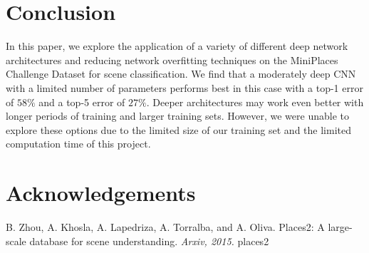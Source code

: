 \documentclass[10pt,twocolumn,letterpaper]{article}
\begin{document}
\section{Conclusion}

In this paper, we explore the application of a variety of different deep network architectures and reducing network overfitting techniques on the MiniPlaces Challenge Dataset for scene classification. We find that a moderately deep CNN with a limited number of parameters performs best in this case with a top-1 error of $58\%$ and a top-5 error of $27\%$. Deeper architectures may work even better with longer periods of training and larger training sets. However, we were unable to explore these options due to the limited size of our training set and the limited computation time of this project.

\section{Acknowledgements}

\begin{thebibliography}{1}

  B. Zhou, A. Khosla, A. Lapedriza, A. Torralba, and A. Oliva.
Places2: A large-scale database for scene understanding.
 \textit{Arxiv, 2015.} places2

  \end{thebibliography}
\end{document}
